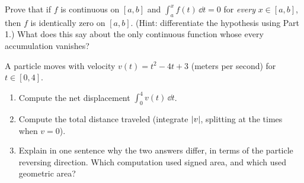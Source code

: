 \begin{exercise}[Proof]
Prove that if $f$ is continuous on $[a,b]$ and $\int_a^x f(t)\,\dd t = 0$ for
\emph{every} $x\in[a,b]$, then $f$ is identically zero on $[a,b]$. (Hint:
differentiate the hypothesis using Part 1.) What does this say about the only
continuous function whose every accumulation vanishes?
\end{exercise}

\begin{exercise}[Synthesis]
A particle moves with velocity $v(t)=t^2-4t+3$ (meters per second) for
$t\in[0,4]$.
\begin{enumerate}[label=(\alph*)]
  \item Compute the net displacement $\int_0^4 v(t)\,\dd t$.
  \item Compute the total distance traveled (integrate $\lvert v\rvert$, splitting at the
  times when $v=0$).
  \item Explain in one sentence why the two answers differ, in terms of the
  particle reversing direction. Which computation used signed area, and which used
  geometric area?
\end{enumerate}
\end{exercise}
